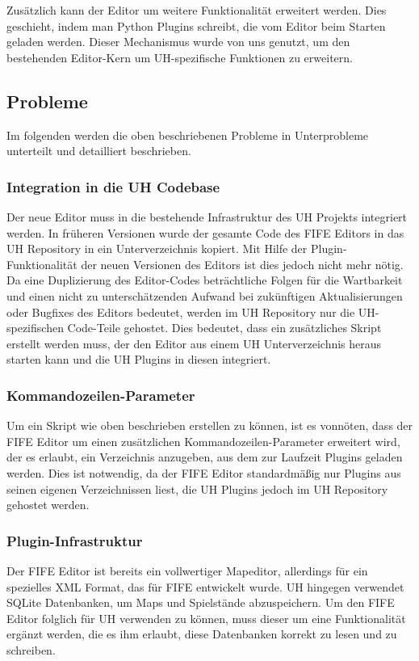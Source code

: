 Zusätzlich kann der Editor um weitere Funktionalität erweitert werden. Dies geschieht,
indem man Python Plugins schreibt, die vom Editor beim Starten geladen werden. Dieser
Mechanismus wurde von uns genutzt, um den bestehenden Editor-Kern um UH-spezifische
Funktionen zu erweitern.

\subsection{Probleme}
Im folgenden werden die oben beschriebenen Probleme in Unterprobleme unterteilt
und detailliert beschrieben.

\subsubsection{Integration in die UH Codebase}
Der neue Editor muss in die bestehende Infrastruktur des UH Projekts integriert werden.
In früheren Versionen wurde der gesamte Code des FIFE Editors in das UH Repository
in ein Unterverzeichnis kopiert. Mit Hilfe der Plugin-Funktionalität der neuen Versionen
des Editors ist dies jedoch nicht mehr nötig. Da eine Duplizierung des Editor-Codes
beträchtliche Folgen für die Wartbarkeit und einen nicht zu unterschätzenden Aufwand
bei zukünftigen Aktualisierungen oder Bugfixes des Editors bedeutet, werden im UH
Repository nur die UH-spezifischen Code-Teile gehostet. Dies bedeutet, dass ein
zusätzliches Skript erstellt werden muss, der den Editor aus einem UH Unterverzeichnis
heraus starten kann und die UH Plugins in diesen integriert.


\subsubsection{Kommandozeilen-Parameter}
Um ein Skript wie oben beschrieben erstellen zu können, ist es vonnöten, dass der FIFE
Editor um einen zusätzlichen Kommandozeilen-Parameter erweitert wird, der es erlaubt, ein
Verzeichnis anzugeben, aus dem zur Laufzeit Plugins geladen werden. Dies ist notwendig, da
der FIFE Editor standardmäßig nur Plugins aus seinen eigenen Verzeichnissen liest, die UH
Plugins jedoch im UH Repository gehostet werden.

\subsubsection{Plugin-Infrastruktur}
Der FIFE Editor ist bereits ein vollwertiger Mapeditor, allerdings für ein spezielles XML Format,
das für FIFE entwickelt wurde. UH hingegen verwendet SQLite Datenbanken, um Maps und Spielstände
abzuspeichern. Um den FIFE Editor folglich für UH verwenden zu können, muss dieser um eine
Funktionalität ergänzt werden, die es ihm erlaubt, diese Datenbanken korrekt zu lesen und zu schreiben.

